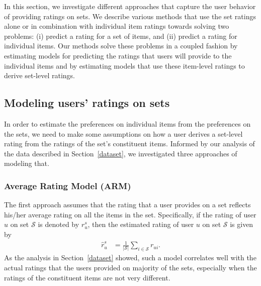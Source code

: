 
In this section, we investigate different approaches that capture the user behavior of providing ratings on sets. We describe various methods that use the set ratings alone or in combination with individual item ratings towards solving two problems: (i) predict a rating for a set of items, and (ii) predict a rating for individual items.  
Our methods solve these problems in a coupled fashion by estimating models for predicting the ratings that users will provide to the individual items and by estimating models that use these item-level ratings to derive set-level ratings.



\iffalse
In this section, we describe various methods that use the set ratings alone
or in combination with individual item ratings towards solving two
problems: (i) predict a rating for a set of items, and (ii)
predict a rating for individual items. 
Our methods solve these problems in a coupled fashion by estimating
models for predicting the ratings that users will provide to the individual
items and by estimating models that use these item-level ratings to derive
set-level ratings.
\fi


\subsection{Modeling users' ratings on sets}
In order to estimate the preferences on individual items from the preferences on the sets, we need to make some assumptions on how a user derives a set-level
rating from the ratings of the set's constituent items.
Informed by our analysis of the data described in Section~\ref{dataset}, we
investigated three approaches of modeling that.



\subsubsection*{Average Rating Model (ARM)}
The first approach assumes that the rating that a user provides
on a set reflects his/her average rating on all the items in the
set. Specifically, if the rating of user $u$ on set $\mathcal{S}$ is denoted by $r_{u}^s$,
then the estimated rating of user $u$ on set $\mathcal{S}$ is given by
\begin{equation} \label{avgSetEq}
  \begin{split}
    \hat{r}_{u}^s &= \frac{1}{|\mathcal{S}|} \sum_{i \in \mathcal{S}} r_{ui}.
  \end{split}
\end{equation}
\noindent As the analysis in Section~\ref{dataset} showed, such a model correlates well
with the actual ratings that the users provided on majority of the sets,
especially when the ratings of the constituent items are not very different.


